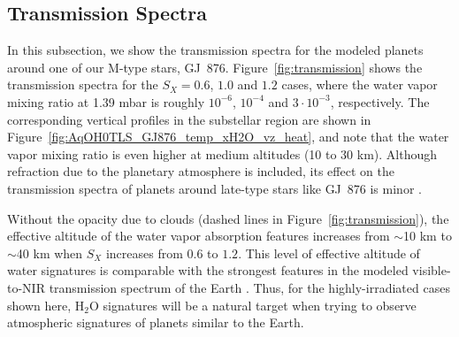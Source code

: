 \documentclass[11pt,numberedappendix,twocolappendix,]{emulateapj}
\def\water{H$_2$O}
\def\preslevel{1.39 mbar}
\def\wv{water vapor}
\begin{document}
\subsection{Transmission Spectra}
\label{ss:result_TransmissionSpectra}

In this subsection, we show the transmission spectra for the modeled planets around one of our M-type stars, GJ~876. 
Figure~\ref{fig:transmission} shows the transmission spectra for the $S_X=0.6$, $1.0$ and $1.2$ cases, where the \wv{} mixing ratio at \preslevel{} is roughly $10^{-6}$, $10^{-4}$ and $3\cdot 10^{-3}$, respectively. 
The corresponding vertical profiles in the substellar region are shown in Figure~\ref{fig:AqOH0TLS_GJ876_temp_xH2O_vz_heat}, and note that the \wv{} mixing ratio is even higher at medium altitudes (10 to 30 km).
Although refraction due to the planetary atmosphere is included, its effect on the transmission spectra of planets around late-type stars like GJ~876 is minor \citep{Betremieux2014,Misra2014}. 


Without the opacity due to clouds (dashed lines in Figure~\ref{fig:transmission}), the effective altitude of the water vapor absorption features increases from $\sim $10 km to $\sim $40 km when $S_X$ increases from $0.6$ to $1.2$. 
This level of effective altitude of water signatures is comparable with the strongest features in the modeled visible-to-NIR transmission spectrum of the Earth \citep[e.g.,][]{Kaltenegger2009}.
Thus, for the highly-irradiated cases shown here, \water{} signatures will be a natural target when trying to observe atmospheric signatures of planets similar to the Earth. 
\end{document}
